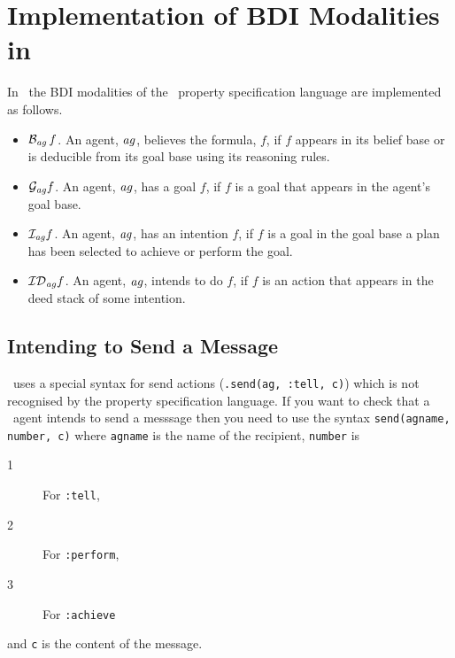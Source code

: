 \appendix
\section{Implementation of BDI Modalities in \gwendolen}
\label{s:impl_bdi}

In \gwendolen\ the BDI modalities of the \ajpf\ property specification language are implemented as follows.

\begin{itemize}
\item $\mathrm{{\cal B}}_{\mathit{ag}} \, f$.  An agent, $\mathit{ag}$, believes the formula, $f$, if $f$ appears in its belief base or is deducible from its goal base using its reasoning rules.
\item $\mathrm{{\cal G}}_{\mathit{ag}} f$.  An agent, $\mathit{ag}$, has a goal $f$, if $f$ is a goal that appears in the agent's goal base.
\item $\mathrm{{\cal I}}_{\mathit{ag}} f$.  An agent, $\mathit{ag}$, has an intention $f$, if $f$ is a goal in the goal base a plan has been selected to achieve or perform the goal.
\item $\mathrm{{\cal ID}}_{\mathit{ag}} f$.  An agent, $\mathit{ag}$, intends to do $f$, if $f$ is an action that appears in the deed stack of some intention.
\end{itemize}

\subsection{Intending to Send a Message}
\gwendolen\ uses a special syntax for send actions (\texttt{.send(ag, :tell, c)}) which is not recognised by the property specification language.  If you want to check that a \gwendolen\ agent intends to send a messsage then you need to use the syntax \texttt{send(agname, number, c)} where \texttt{agname} is the name of the recipient, \texttt{number} is
\begin{description}
\item[1] For \texttt{:tell},
\item[2] For \texttt{:perform},
\item[3] For \texttt{:achieve}
\end{description}
and \texttt{c} is the content of the message.

